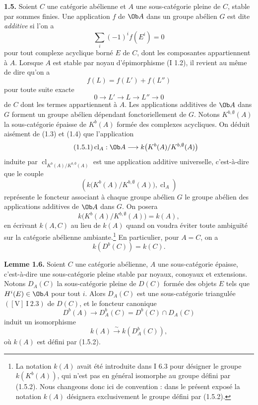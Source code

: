 \documentclass[11pt]{article}
\newcommand{\cl}{\operatorname{cl}}
\begin{document}
\textbf{1.5.} Soient \(C\) une catégorie abélienne et \(A\) une sous-catégorie pleine de \(C\), stable par sommes finies. Une application \(f\) de \(\Ob A\) dans un groupe abélien \(G\) est dite \emph{additive} si l'on a
\[
 \sum_i(-1)^i f(E^i)=0
\]
pour tout complexe acyclique borné \(E\) de \(C\), dont les composantes appartiennent à \(A\). Lorsque \(A\) est stable par noyau d'épimorphisme (I 1.2), il revient au même de dire qu'on a
\[
 f(L)=f(L')+f(L'')
\]
pour toute suite exacte
\[
 0\longrightarrow L'\longrightarrow L\longrightarrow L''\longrightarrow0
\]
de \(C\) dont les termes appartiennent à \(A\). Les applications additives de \(\Ob A\) dans \(G\) forment un groupe abélien dépendant fonctoriellement de \(G\). Notons \(K^{b,\emptyset}(A)\) la sous-catégorie épaisse de \(K^b(A)\) formée des complexes acycliques. On déduit aisément de (1.3) et (1.4) que l'application
\begin{equation}\tag{1.5.1}
 \cl_A:\Ob A\longrightarrow k\bigl(K^b(A)/K^{b,\emptyset}(A)\bigr)
\end{equation}
induite par \(\cl_{K^b(A)/K^{b,\emptyset}(A)}\) est une application additive universelle, c'est-à-dire que le couple
\[
 \left(k\bigl(K^b(A)/K^{b,\emptyset}(A)\bigr),\cl_A\right)
\]
représente le foncteur associant à chaque groupe abélien \(G\) le groupe abélien des applications additives de \(\Ob A\) dans \(G\). On posera
\begin{equation}\tag{1.5.2}
 k\bigl(K^b(A)/K^{b,\emptyset}(A)\bigr)=k(A),
\end{equation}
en écrivant \(k(A,C)\) au lieu de \(k(A)\) quand on voudra éviter toute ambiguïté sur la catégorie abélienne ambiante.\footnote{La notation \(k(A)\) avait été introduite dans I 6.3 pour désigner le groupe \(k(K^b(A))\), qui n'est pas en général isomorphe au groupe défini par (1.5.2). Nous changeons donc ici de convention : dans le présent exposé la notation \(k(A)\) désignera exclusivement le groupe défini par (1.5.2).}
En particulier, pour \(A=C\), on a
\begin{equation}\tag{1.5.3}
 k(D^b(C))=k(C).
\end{equation}

\textbf{Lemme 1.6.} Soient \(C\) une catégorie abélienne, \(A\) une sous-catégorie épaisse, c'est-à-dire une sous-catégorie pleine stable par noyaux, conoyaux et extensions. Notons \(D_A(C)\) la sous-catégorie pleine de \(D(C)\) formée des objets \(E\) tels que \(H^i(E)\in\Ob A\) pour tout \(i\). Alors \(D_A(C)\) est une sous-catégorie triangulée \(([\mathrm V]\ \mathrm I\ 2.3)\) de \(D(C)\), et le foncteur canonique
\[
 D^b(A)\longrightarrow D_A^b(C)=D^b(C)\cap D_A(C)
\]
induit un isomorphisme
\[
 k(A)\xrightarrow{\sim} k(D_A^b(C)),
\]
où \(k(A)\) est défini par (1.5.2).
\end{document}

